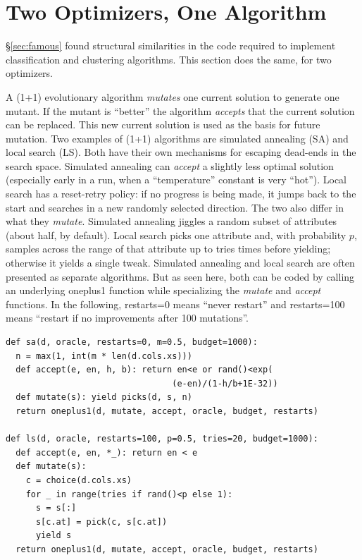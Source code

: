 \section{Two Optimizers, One Algorithm}\label{sec:opt}

\S\ref{sec:famous} found structural similarities in the code required
to implement classification and clustering algorithms. This section
does the same, for two optimizers.

A (1+1) evolutionary algorithm {\em mutates} one current solution to generate
one mutant. If the mutant is ``better'' the algorithm
{\em accepts} that the current solution can be replaced. This new current solution
is used as the basis for future mutation.
Two examples of (1+1) algorithms are
simulated annealing (SA) and local search (LS). Both have their own mechanisms
for escaping dead-ends in the search space. Simulated annealing
can {\em accept} a
slightly less optimal solution (especially early in a run, when a
``temperature'' constant is very ``hot''). Local search has a
reset-retry policy: if no progress is being made, it jumps back to
the start and searches in a new randomly selected direction.
The two also differ in what they {\em mutate}. Simulated annealing
jiggles a random subset of attributes (about half, by default).
Local search picks one attribute and, with probability $p$, samples
across the range of that attribute up to \textsf{tries} times before
yielding; otherwise it yields a single tweak.
Simulated annealing and local search are often presented as separate
algorithms. But as seen here, both can be coded by calling an
underlying \textsf{oneplus1} function while specializing the
{\em mutate} and {\em accept} functions. In the following,
\textsf{restarts=0} means ``never restart'' and \textsf{restarts=100}
means ``restart if no improvements after 100 mutations''.
\begin{verbatim}
def sa(d, oracle, restarts=0, m=0.5, budget=1000): 
  n = max(1, int(m * len(d.cols.xs)))
  def accept(e, en, h, b): return en<e or rand()<exp(
                                 (e-en)/(1-h/b+1E-32))
  def mutate(s): yield picks(d, s, n)
  return oneplus1(d, mutate, accept, oracle, budget, restarts)

def ls(d, oracle, restarts=100, p=0.5, tries=20, budget=1000): 
  def accept(e, en, *_): return en < e
  def mutate(s):
    c = choice(d.cols.xs)
    for _ in range(tries if rand()<p else 1):
      s = s[:]
      s[c.at] = pick(c, s[c.at])
      yield s
  return oneplus1(d, mutate, accept, oracle, budget, restarts)
\end{verbatim}


